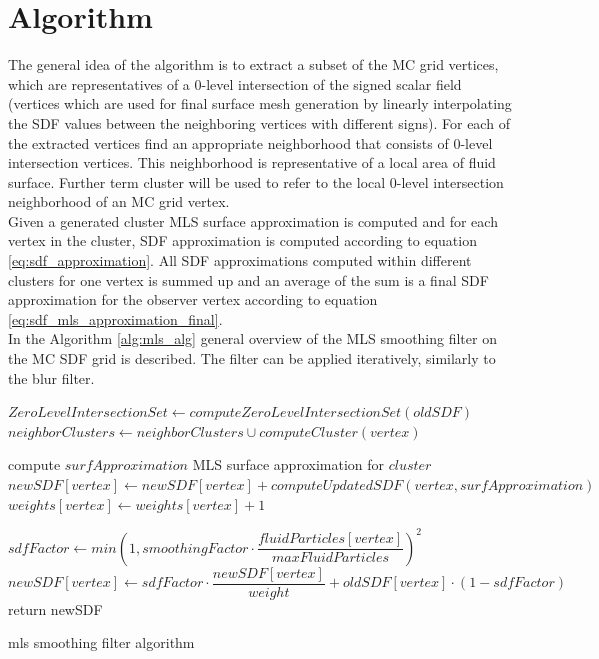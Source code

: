 \section{Algorithm}
The general idea of the algorithm is to extract a subset of the MC grid vertices, which are representatives of a 0-level intersection of the signed scalar field (vertices which are used for final surface mesh generation by linearly interpolating the SDF values between the neighboring vertices with different signs). For each of the extracted vertices find an appropriate neighborhood that consists of 0-level intersection vertices. This neighborhood is representative of a local area of fluid surface. Further term cluster will be used to refer to the local 0-level intersection neighborhood of an MC grid vertex.\\
Given a generated cluster MLS surface approximation is computed and for each vertex in the cluster, SDF approximation is computed according to equation \ref{eq:sdf_approximation}. All SDF approximations computed within different clusters for one vertex is summed up and an average of the sum is a final SDF approximation for the observer vertex according to equation \ref{eq:sdf_mls_approximation_final}.\\
In the Algorithm \ref{alg:mls_alg} general overview of the MLS smoothing filter on the MC SDF grid is described. The filter can be applied iteratively, similarly to the blur filter.
\begin{algorithm}[H]
	\scriptsize
	\begin{algorithmic}
		\State $ZeroLevelIntersectionSet \gets computeZeroLevelIntersectionSet(oldSDF)$
			\State $neighborClusters \gets neighborClusters \cup computeCluster(vertex)$
		\EndFor
			
			\State compute $surfApproximation$ MLS surface approximation for $cluster$
				\State $newSDF[vertex] \gets newSDF[vertex] + computeUpdatedSDF(vertex, surfApproximation)$
				\State $weights[vertex] \gets weights[vertex] + 1$
			\EndFor
		\EndFor

			\State $sdfFactor \gets min\left(1, smoothingFactor \cdot \dfrac{fluidParticles[vertex]}{maxFluidParticles}\right)^2$
			\State $newSDF[vertex] \gets sdfFactor \cdot \dfrac{newSDF[vertex]}{weight} + oldSDF[vertex] \cdot (1 - sdfFactor)$
		\EndFor
		\State return newSDF
	\end{algorithmic}
	\caption{mls smoothing filter algorithm}
	\label{alg:mls_alg}
\end{algorithm}
